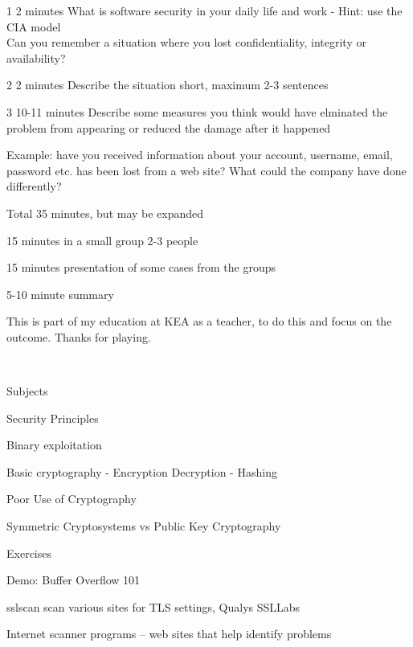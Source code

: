 \documentclass[Screen16to9,17pt]{foils}
\begin{document}
\begin{list2}
\item[1] 2 minutes What is software security in your daily life and work - Hint: use the CIA model\\
Can you remember a situation where you lost confidentiality, integrity or availability?

\item[2] 2 minutes Describe the situation short, maximum 2-3 sentences

\item[3] 10-11 minutes Describe some measures you think would have elminated the problem from appearing or reduced the damage after it happened

\item Example: have you received information about your account, username, email, password etc. has been lost from a web site? What could the company have done differently?

\end{list2}



Total 35 minutes, but may be expanded

\begin{list2}
\item 15 minutes in a small group 2-3 people
\item 15 minutes presentation of some cases from the groups
\item 5-10 minute summary
\end{list2}

This is part of my education at KEA as a teacher, to do this and focus on the outcome. Thanks for playing.


{~}

\begin{list1}
\item Subjects
\begin{list2}
\item Security Principles
\item Binary exploitation
\item Basic cryptography - Encryption Decryption - Hashing
\item Poor Use of Cryptography
\item Symmetric Cryptosystems vs  Public Key Cryptography
\end{list2}
\item Exercises
\begin{list2}
\item Demo: Buffer Overflow 101
\item sslscan scan various sites for TLS settings, Qualys SSLLabs
\item Internet scanner programs -- web sites that help identify problems
\end{list2}
\end{list1}
\end{document}
